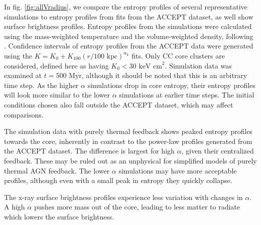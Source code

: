 \documentclass[iop,apjl, twocolappendix]{emulateapj}   %
\begin{document}
In fig. \ref{fig:allVradius}, we compare the entropy profiles of several
representative simulations to entropy profiles from fits from the ACCEPT
dataset, as well show surface brightness profiles. Entropy profiles from the
simulations were calculated using the mass-weighted temperature and the
volume-weighted density, following \citep{}. Confidence intervals of entropy
profiles from the ACCEPT data were generated using the $K = K_0 + K_{100} \left
( r/100 \text{ kpc} \right )^{\alpha_k}$ fits. Only CC core clusters are
considered, defined here as having $K_0 < 30 \text{ keV cm}^2$. Simulation data
was examined at $t = 500 \text{ Myr}$, although it should be noted that this is
an arbitrary time step. As the higher $\alpha$ simulations drop in core
entropy, their entropy profiles will look more similar to the lower $\alpha$
simulations at earlier time steps. The initial conditions chosen also fall
outside the ACCEPT dataset, which may affect comparisons.

The simulation data with purely thermal feedback shows peaked entropy profiles
towards the core, inherently in contrast to the power-law profiles generated
from the ACCEPT dataset. The difference is largest for high $\alpha$, given
their centralized feedback. These may be ruled out as an unphysical for
simplified models of purely thermal AGN feedback.  The lower $\alpha$
simulations may have more acceptable profiles, although even with a small peak
in entropy they quickly collapse.

The x-ray surface brightness profiles experience less variation with changes in
$\alpha$. A high $\alpha$ pushes more mass out of the core, leading to less
matter to radiate which lowers the surface brightness.
\end{document}
